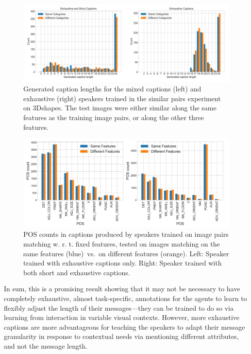 \begin{figure}[h]
	\centering
	\includegraphics[width=\linewidth]{images/3dshapes_exh_short_similar_sameTest_diffTest_length_counts.png}
	\caption{Generated caption lengths for the mixed captions (left) and exhaustive (right) speakers trained in the similar pairs experiment on 3Dshapes. The test images were either similar along the same features as the training image pairs, or along the other three features.}
	\label{fig:3dshapes_exh_short_same_diff_lengths}
\end{figure}

\begin{figure}[h]
	\centering
	\includegraphics[width=\linewidth]{images/3dshapes_similarFixedPairs_exh_vs_short_sameTest_vs_diffTest_POS_counts.png}
	\caption{POS counts in captions produced by speakers trained on image pairs matching w. r. t. fixed features, tested on images matching on the same features (blue)~vs.~on different features (orange). Left: Speaker trained with exhaustive captions only. Right: Speaker trained with both short and exhaustive captions.}
	\label{fig:3dshapes_exh_short_same_diff_POS}
\end{figure}

In sum, this is a promising result showing that it may not be necessary to have completely exhaustive, almost task-specific, annotations for the agents to learn to flexibly adjust the length of their messages---they can be trained to do so via learning from interaction in variable visual contexts. However, more exhaustive captions are more advantageous for teaching the speakers to adapt their message granularity in response to contextual needs via mentioning different attributes, and not the message length.


